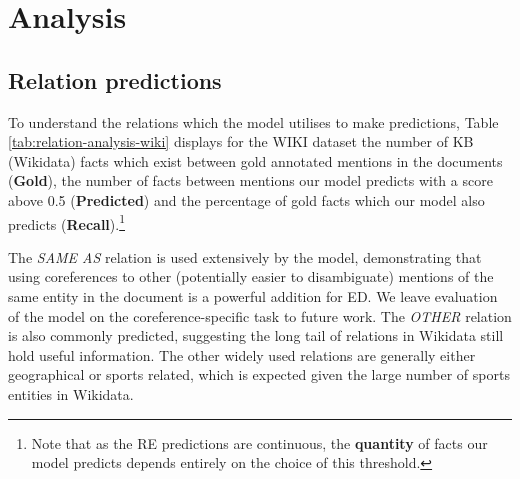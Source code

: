 \documentclass[11pt]{article}
\begin{document}
\begin{table}[h]
\caption{Percentage of gold entities in top-n candidates by dataset. We set n=30 for this paper.}
\label{tab:gold-percentage}
\end{table}




\section{Analysis}

\subsection{Relation predictions}
\label{sec:analysis}
To understand the relations which the model utilises to make predictions, Table \ref{tab:relation-analysis-wiki} displays for the WIKI dataset the number of KB (Wikidata) facts which exist between gold annotated mentions in the documents (\textbf{Gold}), the number of facts between mentions our model predicts with a score above 0.5 (\textbf{Predicted}) and the percentage of gold facts which our model also predicts (\textbf{Recall}).\footnote{Note that as the RE predictions are continuous, the \textbf{quantity} of facts our model predicts depends entirely on the choice of this threshold.}


The \emph{SAME AS} relation is used extensively by the model, demonstrating that using coreferences to other (potentially easier to disambiguate) mentions of the same entity in the document is a powerful addition for ED. We leave evaluation of the model on the coreference-specific task to future work. The \emph{OTHER} relation is also commonly predicted, suggesting the long tail of relations in Wikidata still hold useful information. The other widely used relations are generally either geographical or sports related, which is expected given the large number of sports entities in Wikidata. 
\end{document}
